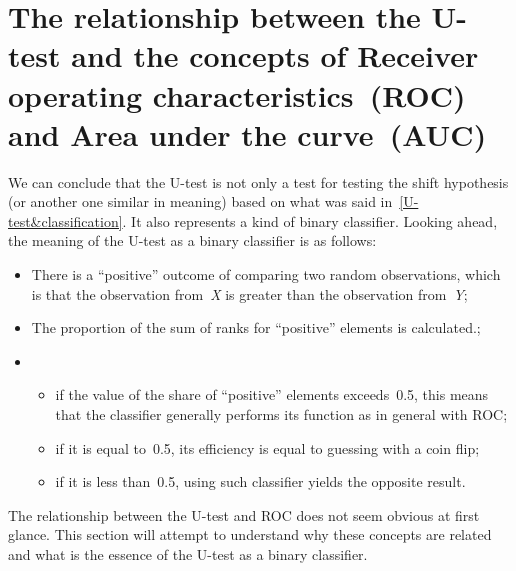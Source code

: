\documentclass[]{scrreprt}
\begin{document}
\section{The relationship between the U-test and the concepts of Receiver operating characteristics~(ROC) and Area under the curve~(AUC)}\label{U-AUC}
We can conclude that the U-test is not only a test for testing the shift hypothesis (or another one similar in meaning) based on what was said in~\ref{U-test&classification}. It also represents a kind of binary classifier. Looking ahead, the meaning of the U-test as a binary classifier is as follows:
\begin{itemize}
	\item There is a ``positive'' outcome of comparing two random observations, which is that the observation from~\textit{X} is greater than the observation from~\textit{Y};
	\item The proportion of the sum of ranks for ``positive'' elements is calculated.;
	\item
	\begin{itemize}
		\item if the value of the share of ``positive'' elements exceeds~0.5, this means that the classifier generally performs its function as in general with ROC;
		\item if it is equal to~0.5, its efficiency is equal to guessing with a coin flip;
		\item if it is less than~0.5, using such classifier yields the opposite result.
	\end{itemize} 	 
\end{itemize}
The relationship between the U-test and ROC does not seem obvious at first glance. This section will attempt to understand why these concepts are related and what is the essence of the U-test as a binary classifier.
\end{document}
